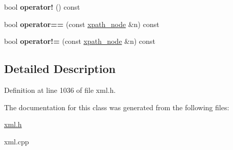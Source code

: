 \begin{DoxyCompactItemize}
\item 
\hypertarget{classphys_1_1xml_1_1xpath__node_adaf2965c9efbe1690a4b4feda88f153d}{
bool {\bfseries operator!} () const }
\label{d3/d5a/classphys_1_1xml_1_1xpath__node_adaf2965c9efbe1690a4b4feda88f153d}

\item 
\hypertarget{classphys_1_1xml_1_1xpath__node_aece2f21210be813f1acb58827e35ed78}{
bool {\bfseries operator==} (const \hyperlink{classphys_1_1xml_1_1xpath__node}{xpath\_\-node} \&n) const }
\label{d3/d5a/classphys_1_1xml_1_1xpath__node_aece2f21210be813f1acb58827e35ed78}

\item 
\hypertarget{classphys_1_1xml_1_1xpath__node_aee14528f0686476a8c34b5d780e53a4a}{
bool {\bfseries operator!=} (const \hyperlink{classphys_1_1xml_1_1xpath__node}{xpath\_\-node} \&n) const }
\label{d3/d5a/classphys_1_1xml_1_1xpath__node_aee14528f0686476a8c34b5d780e53a4a}

\end{DoxyCompactItemize}


\subsection{Detailed Description}


Definition at line 1036 of file xml.h.



The documentation for this class was generated from the following files:\begin{DoxyCompactItemize}
\item 
\hyperlink{xml_8h}{xml.h}\item 
xml.cpp\end{DoxyCompactItemize}
